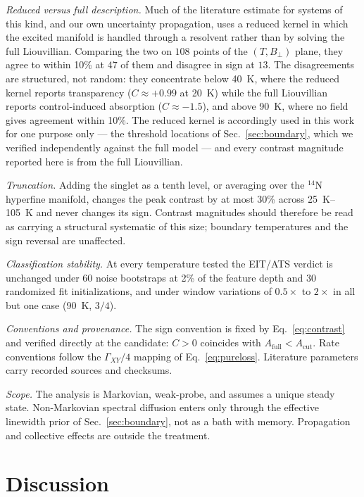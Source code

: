 \documentclass[
  reprint,
  amsmath,amssymb,
  aps,pra,
  superscriptaddress,
  floatfix,
]{revtex4-2}
\newcommand{\Bperp}{B_{\perp}}
\newcommand{\Acut}{A_{\mathrm{cut}}}
\newcommand{\Afull}{A_{\mathrm{full}}}
\newcommand{\Gxy}{\Gamma_{XY}}
\begin{document}
\emph{Reduced versus full description.} Much of the literature estimate for
systems of this kind, and our own uncertainty propagation, uses a reduced
kernel in which the excited manifold is handled through a resolvent rather
than by solving the full Liouvillian. Comparing the two on $108$ points of the
$(T,\Bperp)$ plane, they agree to within 10\% at $47$ of them and disagree in
sign at $13$. The disagreements are structured, not random: they concentrate
below \SI{40}{\kelvin}, where the reduced kernel reports transparency
($C\approx+0.99$ at \SI{20}{\kelvin}) while the full Liouvillian reports
control-induced absorption ($C\approx-1.5$), and above \SI{90}{\kelvin}, where
no field gives agreement within 10\%. The reduced kernel is accordingly used
in this work for one purpose only --- the threshold locations of
Sec.~\ref{sec:boundary}, which we verified independently against the full
model --- and every contrast magnitude reported here is from the full
Liouvillian.

\emph{Truncation.} Adding the singlet as a tenth level, or averaging over the
$^{14}$N hyperfine manifold, changes the peak contrast by at most 30\% across
\SI{25}{\kelvin}--\SI{105}{\kelvin} and never changes its sign. Contrast
magnitudes should therefore be read as carrying a structural systematic of
this size; boundary temperatures and the sign reversal are unaffected.

\emph{Classification stability.} At every temperature tested the EIT/ATS
verdict is unchanged under $60$ noise bootstraps at 2\% of the feature depth
and $30$ randomized fit initializations, and under window variations of
$0.5\times$ to $2\times$ in all but one case (\SI{90}{\kelvin}, $3/4$).

\emph{Conventions and provenance.} The sign convention is fixed by
Eq.~\eqref{eq:contrast} and verified directly at the candidate: $C>0$
coincides with $\Afull<\Acut$. Rate conventions follow the $\Gxy/4$ mapping of
Eq.~\eqref{eq:pureloss}. Literature parameters carry recorded sources and
checksums.

\emph{Scope.} The analysis is Markovian, weak-probe, and assumes a unique
steady state. Non-Markovian spectral diffusion enters only through the
effective linewidth prior of Sec.~\ref{sec:boundary}, not as a bath with
memory. Propagation and collective effects are outside the treatment.

\section{Discussion}
\end{document}
